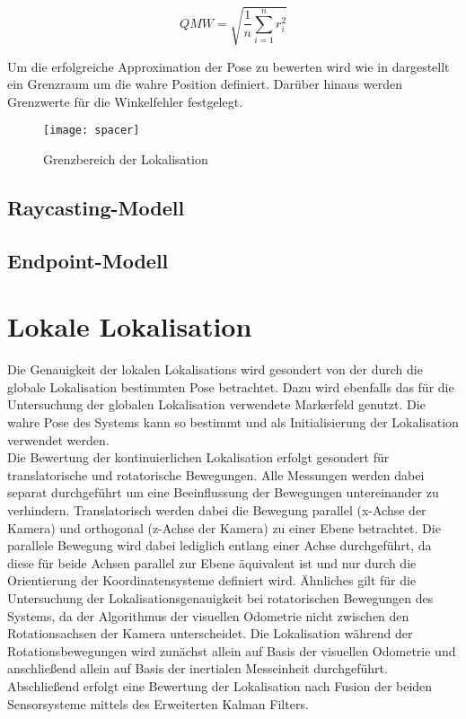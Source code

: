 \begin{equation}
QMW = \sqrt{\frac{1}{n}\sum_{i=1}^nr_i^2}
\end{equation}

Um die erfolgreiche Approximation der Pose zu bewerten wird wie in  dargestellt ein Grenzraum um die wahre Position definiert. Darüber hinaus werden Grenzwerte für die Winkelfehler festgelegt. 

\begin{figure}[!ht]
	\begin{center}
		\texttt{[image: spacer]}
		\caption{Grenzbereich der Lokalisation}
		\label{fig.loclimits}
	\end{center}
\end{figure}


\subsection{Raycasting-Modell}

\subsection{Endpoint-Modell}


\section{Lokale Lokalisation}%
Die Genauigkeit der lokalen Lokalisations wird gesondert von der durch die globale Lokalisation bestimmten Pose betrachtet. Dazu wird ebenfalls das für die Untersuchung der globalen Lokalisation verwendete Markerfeld genutzt. Die wahre Pose des Systems kann so bestimmt und als Initialisierung der Lokalisation verwendet werden.\\
Die Bewertung der kontinuierlichen Lokalisation erfolgt gesondert für translatorische und rotatorische Bewegungen. Alle Messungen werden dabei separat durchgeführt um eine Beeinflussung der Bewegungen untereinander zu verhindern. Translatorisch werden dabei die Bewegung parallel (x-Achse der Kamera) und orthogonal (z-Achse der Kamera) zu einer Ebene betrachtet. Die parallele Bewegung wird dabei lediglich entlang einer Achse durchgeführt, da diese für beide Achsen parallel zur Ebene äquivalent ist und nur durch die Orientierung der Koordinatensysteme definiert wird. Ähnliches gilt für die Untersuchung der Lokalisationsgenauigkeit bei rotatorischen Bewegungen des Systems, da der Algorithmus der visuellen Odometrie nicht zwischen den Rotationsachsen der Kamera unterscheidet. Die Lokalisation während der Rotationsbewegungen wird zunächst allein auf Basis der visuellen Odometrie und anschließend allein auf Basis der inertialen Messeinheit durchgeführt. Abschließend erfolgt eine Bewertung der Lokalisation nach Fusion der beiden Sensorsysteme mittels des Erweiterten Kalman Filters.

